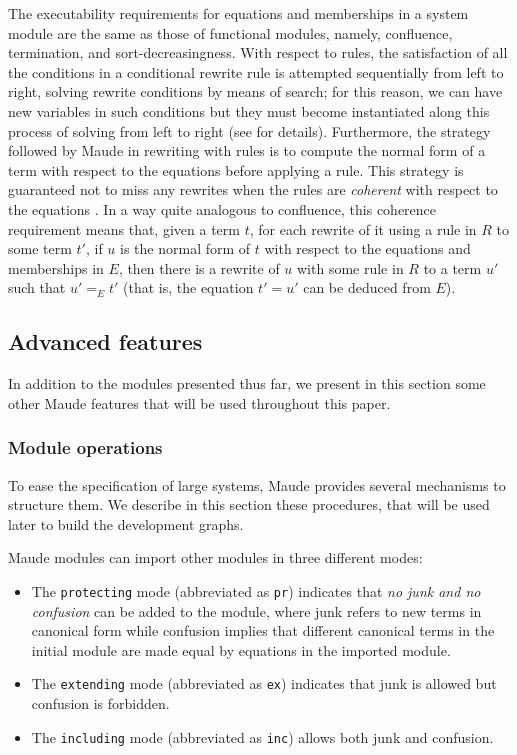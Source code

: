 The executability requirements for equations and memberships in a system
module are the same as those of functional modules, namely, confluence,
termination, and sort-decreasingness. With respect to rules, the satisfaction
of all the conditions in a conditional rewrite rule is attempted sequentially 
from left to right, solving rewrite conditions by means of search; 
for this reason, we can have new variables in such conditions but they
must become instantiated along this process of solving from left to right
(see \cite{maude-book} for details). Furthermore, the strategy followed
by Maude in rewriting with rules is to compute the normal form of a term
with respect to the equations before applying a rule. This strategy is
guaranteed not to miss any rewrites when the rules are \emph{coherent}
with respect to the equations \cite{eq-rl-rwl,maude-book}. In a way
quite analogous to confluence, this coherence requirement means that, given
a term $t$, for each rewrite of it using a rule in $R$ to some term $t'$,
if $u$ is the normal form of $t$ with respect to the equations and
memberships in $E$, then there is a rewrite of $u$ with some rule in
$R$ to a term $u'$ such that $u' =_E t'$ (that is, the equation $t' = u'$
can be deduced from $E$).

\subsection{Advanced features}\label{subsec:adv_feat}

In addition to the modules presented thus far, we present in this section
some other Maude features that will be used throughout this paper.

\subsubsection{Module operations}

To ease the specification of large systems, Maude provides several
mechanisms to structure them. We describe in this section these
procedures, that will be used later to build the development graphs.

Maude modules can import other modules in three different modes:
\begin{itemize}
\item
The \verb"protecting" mode (abbreviated as \verb"pr") indicates that \emph{no
junk and no confusion} can be added to the module, where junk refers to
new terms in canonical form while confusion implies that different canonical
terms in the initial module are made equal by equations in the imported module.

\item
The \verb"extending" mode (abbreviated as \verb"ex") indicates that junk is
allowed but confusion is forbidden.

\item
The \verb"including" mode (abbreviated as \verb"inc") allows both
junk and confusion.

\end{itemize}


